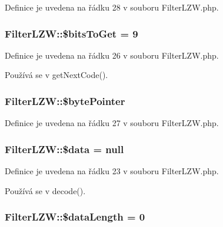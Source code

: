 Definice je uvedena na řádku 28 v souboru Filter\-L\-Z\-W.\-php.

\hypertarget{class_filter_l_z_w_ad92fc4666c3d6915b340aa7d67343c68}{
\subsubsection[{\$bits\-To\-Get}]{\setlength{\rightskip}{0pt plus 5cm}Filter\-L\-Z\-W\-::\$bits\-To\-Get = 9}}\label{class_filter_l_z_w_ad92fc4666c3d6915b340aa7d67343c68}


Definice je uvedena na řádku 26 v souboru Filter\-L\-Z\-W.\-php.



Používá se v get\-Next\-Code().

\hypertarget{class_filter_l_z_w_a54df8318ce63e6f48196d53dc7221733}{
\subsubsection[{\$byte\-Pointer}]{\setlength{\rightskip}{0pt plus 5cm}Filter\-L\-Z\-W\-::\$byte\-Pointer}}\label{class_filter_l_z_w_a54df8318ce63e6f48196d53dc7221733}


Definice je uvedena na řádku 27 v souboru Filter\-L\-Z\-W.\-php.

\hypertarget{class_filter_l_z_w_a6ec0e1525bcaa77a27610a2eb9d3f39c}{
\subsubsection[{\$data}]{\setlength{\rightskip}{0pt plus 5cm}Filter\-L\-Z\-W\-::\$data = null}}\label{class_filter_l_z_w_a6ec0e1525bcaa77a27610a2eb9d3f39c}


Definice je uvedena na řádku 23 v souboru Filter\-L\-Z\-W.\-php.



Používá se v decode().

\hypertarget{class_filter_l_z_w_a14795d6149da54c3fbe7794ad4568b8f}{
\subsubsection[{\$data\-Length}]{\setlength{\rightskip}{0pt plus 5cm}Filter\-L\-Z\-W\-::\$data\-Length = 0}}\label{class_filter_l_z_w_a14795d6149da54c3fbe7794ad4568b8f}


